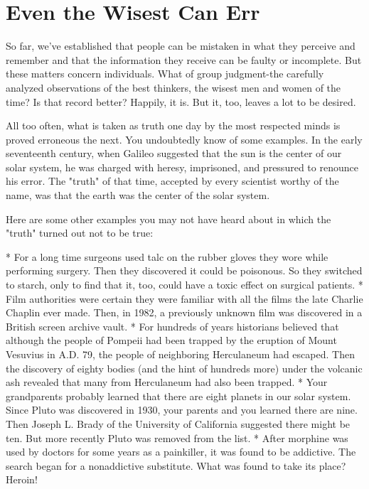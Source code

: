\documentclass{book}
\begin{document}
\section{Even the Wisest Can Err}

So far, we’ve established that people can be mistaken in what they perceive and remember and that the information they receive can be faulty or incomplete. But these matters concern individuals. What of group judgment-the carefully analyzed observations of the best thinkers, the wisest men and women of the time? Is that record better? Happily, it is.  But it, too, leaves a lot to be desired.

All too often, what is taken as truth one day by the most respected minds is proved erroneous the next. You undoubtedly know of some examples. In the early seventeenth century, when Galileo suggested that the sun is the center of our solar system, he was charged with heresy, imprisoned, and pressured to renounce his error. The "truth" of that time, accepted by every scientist worthy of the name, was that the earth was the center of the solar system.

Here are some other examples you may not have heard about in which the "truth" turned out not to be true:

* For a long time surgeons used talc on the rubber gloves they wore while performing surgery. Then they discovered it could be poisonous.  So they switched to starch, only to find that it, too, could have a toxic effect on surgical patients.
* Film authorities were certain they were familiar with all the films the late Charlie Chaplin ever made. Then, in 1982, a previously unknown film was discovered in a British screen archive vault.
* For hundreds of years historians believed that although the people of Pompeii had been trapped by the eruption of Mount Vesuvius in A.D. 79, the people of neighboring Herculaneum had escaped. Then the discovery of eighty bodies (and the hint of hundreds more) under the volcanic ash revealed that many from Herculaneum had also been trapped.
* Your grandparents probably learned that there are eight planets in our solar system. Since Pluto was discovered in 1930, your parents and you learned there are nine. Then Joseph L. Brady of the University of California suggested there might be ten.   But more recently Pluto was removed from the list.
* After morphine was used by doctors for some years as a painkiller, it was found to be addictive. The search began for a nonaddictive substitute. What was found to take its place? Heroin!
\end{document}
